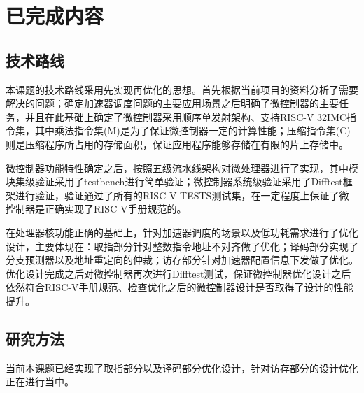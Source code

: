\documentclass[a4paper, 12pt]{article}
\begin{document}

\clearpage
\section{已完成内容}%
\subsection{技术路线}%
本课题的技术路线采用先实现再优化的思想。首先根据当前项目的资料分析了需要解决的问题；确定加速器调度问题的主要应用场景之后明确了微控制器的主要任务，并且在此基础上确定了微控制器采用顺序单发射架构、支持RISC-V 32IMC指令集，其中乘法指令集(M)是为了保证微控制器一定的计算性能；压缩指令集(C)则是压缩程序所占用的存储面积，保证应用程序能够存储在有限的片上存储中。

微控制器功能特性确定之后，按照五级流水线架构对微处理器进行了实现，其中模块集级验证采用了testbench进行简单验证；微控制器系统级验证采用了Difftest框架进行验证，验证通过了所有的RISC-V TESTS测试集，在一定程度上保证了微控制器是正确实现了RISC-V手册规范的。

在处理器核功能正确的基础上，针对加速器调度的场景以及低功耗\cite{8106976}需求进行了优化设计，主要体现在：取指部分针对整数指令地址不对齐做了优化；译码部分实现了分支预测器以及地址重定向的仲裁；访存部分针对加速器配置信息下发做了优化。优化设计完成之后对微控制器再次进行Difftest测试，保证微控制器优化设计之后依然符合RISC-V手册规范、检查优化之后的微控制器设计是否取得了设计的性能提升。
  
\clearpage
\subsection{研究方法}%
当前本课题已经实现了取指部分以及译码部分优化设计，针对访存部分的设计优化正在进行当中。
\end{document}
